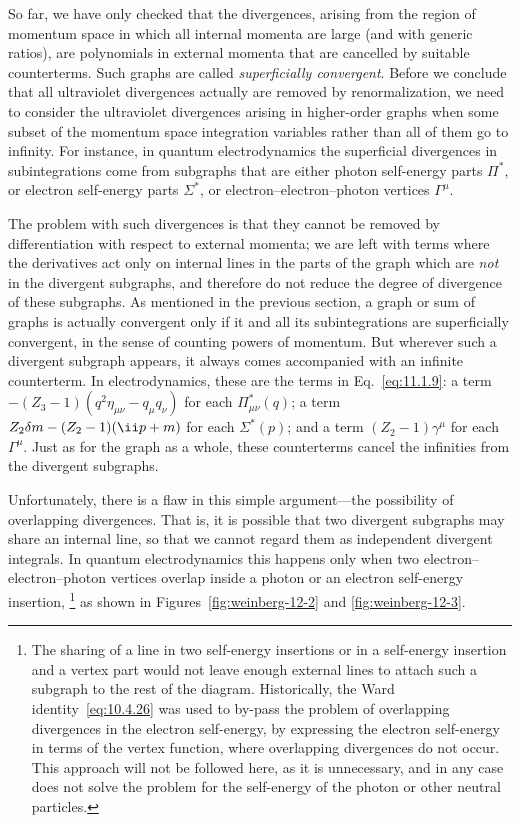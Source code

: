 So far, we have only checked that the divergences, arising from the region
of momentum space in which all internal momenta are large (and with generic
ratios), are polynomials in external momenta that are cancelled by suitable
counterterms. Such graphs are called \emph{superficially convergent}. Before
we conclude that all ultraviolet divergences actually are removed by
renormalization, we need to consider the ultraviolet divergences arising in
higher-order graphs when some subset of the momentum space integration
variables rather than all of them go to infinity. For instance, in quantum
electrodynamics the superficial divergences in subintegrations come from
subgraphs that are either photon self-energy parts $\Pi^*$, or electron
self-energy parts $\Sigma^*$, or electron--electron--photon vertices
$\Gamma^\mu$.



The problem with such divergences is that they cannot be removed by
differentiation with respect to external momenta; we are left with terms
where the derivatives act only on internal lines in the parts of the graph
which are \emph{not} in the divergent subgraphs, and therefore do not reduce
the degree of divergence of these subgraphs. As mentioned in the previous
section, a graph or sum of graphs is actually convergent only if it and all
its subintegrations are superficially convergent, in the sense of counting
powers of momentum. But wherever such a divergent subgraph appears, it
always comes accompanied with an infinite counterterm. In electrodynamics,
these are the terms in Eq.~\eqref{eq:11.1.9}: a term
$-(Z_3-1)(q^2\eta_{\mu\nu}-q_\mu q_\nu)$ for each $\Pi_{\mu\nu}^*(q)$; a
term $Z_2\delta m-(Z_2-1)(\ii\sl{p}+m)$ for each $\Sigma^*(p)$; and a term
$(Z_2-1)\gamma^\mu$ for each $\Gamma^\mu$. Just as for the graph as a whole,
these counterterms cancel the infinities from the divergent subgraphs.

Unfortunately, there is a flaw in this simple argument---the possibility of
overlapping divergences. That is, it is possible that two divergent subgraphs
may share an internal line, so that we cannot regard them as independent
divergent integrals. In quantum electrodynamics this happens only when two
electron--electron--photon vertices overlap inside a photon or an electron
self-energy insertion,
\footnote{The sharing of a line in two self-energy insertions or in a
self-energy insertion and a vertex part would not leave enough external
lines to attach such a subgraph to the rest of the diagram. Historically,
the Ward identity~\eqref{eq:10.4.26} was used to by-pass the problem of overlapping
divergences in the electron self-energy, by expressing the electron
self-energy in terms of the vertex function, where overlapping divergences
do not occur. This approach will not be followed here, as it is unnecessary,
and in any case does not solve the problem for the self-energy of the photon
or other neutral particles.}
as shown in Figures~\ref{fig:weinberg-12-2} and \ref{fig:weinberg-12-3}.

